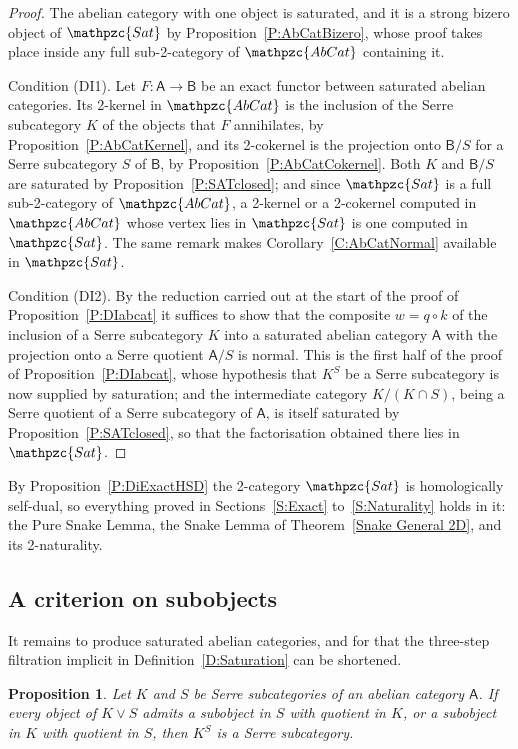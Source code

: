 \documentclass[reqno,a4paper]{amsart}
\numberwithin{equation}{section}
\theoremstyle{plain}
\newtheorem{proposition}[subsection]{Proposition}
\theoremstyle{definition}
\def\nameit#1{\textrm{#1}~}
\def\thex{\nameit{Theorem}}
\def\prox{\nameit{Proposition}}
\def\corx{\nameit{Corollary}}
\def\defx{\nameit{Definition}}
\newcommand{\comp}{\circ}
\newcommand{\catfont}[1]{\ensuremath{\mathpzc{#1}}\xspace}
\newcommand{\onecat}[1]{\ensuremath{\mathsf{#1}}\xspace}
\newcommand{\AbCat}{\catfont{AbCat}}
\newcommand{\Sat}{\catfont{Sat}}
\renewcommand{\1}{\onecat{1}}
\begin{document}
\begin{proof}
	The abelian category with one object is saturated, and it is a strong bizero object of \(\Sat\) by \prox\ref{P:AbCatBizero}, whose proof takes place inside any full sub-2-category of \(\AbCat\) containing it.

	Condition \textup{(DI1)}. Let \(F\colon\onecat{A}\to\onecat{B}\) be an exact functor between saturated abelian categories. Its 2-kernel in \(\AbCat\) is the inclusion of the Serre subcategory \(K\) of the objects that \(F\) annihilates, by \prox\ref{P:AbCatKernel}, and its 2-cokernel is the projection onto \(\onecat{B}/S\) for a Serre subcategory \(S\) of \(\onecat{B}\), by \prox\ref{P:AbCatCokernel}. Both \(K\) and \(\onecat{B}/S\) are saturated by \prox\ref{P:SATclosed}; and since \(\Sat\) is a full sub-2-category of \(\AbCat\), a 2-kernel or a 2-cokernel computed in \(\AbCat\) whose vertex lies in \(\Sat\) is one computed in \(\Sat\). The same remark makes \corx\ref{C:AbCatNormal} available in \(\Sat\).

	Condition \textup{(DI2)}. By the reduction carried out at the start of the proof of \prox\ref{P:DIabcat} it suffices to show that the composite \(w=q\comp k\) of the inclusion of a Serre subcategory \(K\) into a saturated abelian category \(\onecat{A}\) with the projection onto a Serre quotient \(\onecat{A}/S\) is normal. This is the first half of the proof of \prox\ref{P:DIabcat}, whose hypothesis that \(K^{S}\) be a Serre subcategory is now supplied by saturation; and the intermediate category \(K/(K\cap S)\), being a Serre quotient of a Serre subcategory of \(\onecat{A}\), is itself saturated by \prox\ref{P:SATclosed}, so that the factorisation obtained there lies in \(\Sat\).
\end{proof}

By \prox\ref{P:DiExactHSD} the 2-category \(\Sat\) is homologically self-dual, so everything proved in Sections~\ref{S:Exact} to~\ref{S:Naturality} holds in it: the Pure Snake Lemma, the Snake Lemma of \thex\ref{Snake General 2D}, and its 2-naturality.

\subsection{A criterion on subobjects}\label{SS:ModelAS}

It remains to produce saturated abelian categories, and for that the three-step filtration implicit in \defx\ref{D:Saturation} can be shortened.

\begin{proposition}\label{P:TwoStep}
	Let \(K\) and \(S\) be Serre subcategories of an abelian category \(\onecat{A}\). If every object of \(K\vee S\) admits a subobject in \(S\) with quotient in \(K\), or a subobject in \(K\) with quotient in \(S\), then \(K^{S}\) is a Serre subcategory.
\end{proposition}
\end{document}
